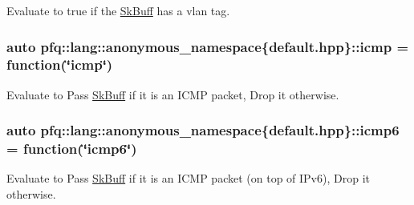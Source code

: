 Evaluate to {\ttfamily true} if the \hyperlink{structpfq_1_1lang_1_1SkBuff}{Sk\+Buff} has a vlan tag. 

\subsubsection[{\texorpdfstring{icmp}{icmp}}]{\setlength{\rightskip}{0pt plus 5cm}auto pfq\+::lang\+::anonymous\+\_\+namespace\{default.\+hpp\}\+::icmp = {\bf function}(\char`\"{}icmp\char`\"{})}\hypertarget{namespacepfq_1_1lang_1_1anonymous__namespace_02default_8hpp_03_a3becf93771a800904f002e39b1cc388f}{}\label{namespacepfq_1_1lang_1_1anonymous__namespace_02default_8hpp_03_a3becf93771a800904f002e39b1cc388f}


Evaluate to {\ttfamily Pass} \hyperlink{structpfq_1_1lang_1_1SkBuff}{Sk\+Buff} if it is an I\+C\+MP packet, {\ttfamily Drop} it otherwise. 

\subsubsection[{\texorpdfstring{icmp6}{icmp6}}]{\setlength{\rightskip}{0pt plus 5cm}auto pfq\+::lang\+::anonymous\+\_\+namespace\{default.\+hpp\}\+::icmp6 = {\bf function}(\char`\"{}icmp6\char`\"{})}\hypertarget{namespacepfq_1_1lang_1_1anonymous__namespace_02default_8hpp_03_a8fda9498af823eec4f9f8d81d4a171d5}{}\label{namespacepfq_1_1lang_1_1anonymous__namespace_02default_8hpp_03_a8fda9498af823eec4f9f8d81d4a171d5}


Evaluate to {\ttfamily Pass} \hyperlink{structpfq_1_1lang_1_1SkBuff}{Sk\+Buff} if it is an I\+C\+MP packet (on top of I\+Pv6), {\ttfamily Drop} it otherwise. 

